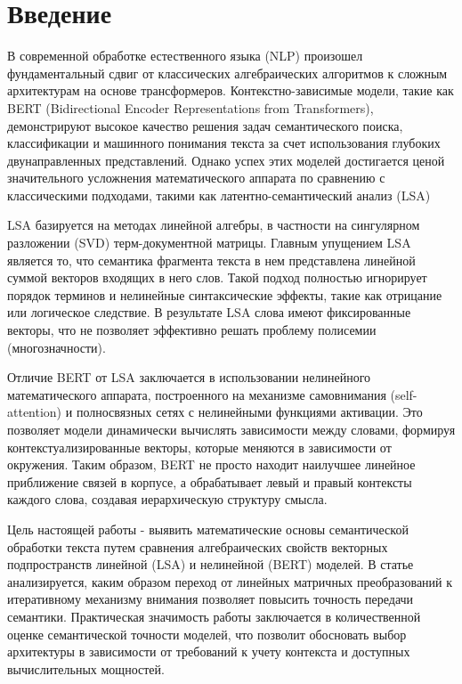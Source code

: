 \documentclass{article}
\begin{document}
\section{Введение}

В современной обработке естественного языка (NLP) произошел фундаментальный
сдвиг от классических алгебраических алгоритмов к сложным архитектурам на основе
трансформеров. Контекстно-зависимые модели, такие как BERT
(Bidirectional Encoder Representations from Transformers), демонстрируют
высокое качество решения задач семантического поиска, классификации и машинного
понимания текста за счет использования глубоких двунаправленных
представлений. Однако успех этих моделей достигается ценой значительного
усложнения математического аппарата по сравнению с классическими подходами,
такими как латентно-семантический анализ (LSA)

LSA базируется на методах линейной алгебры, в частности на сингулярном
разложении (SVD) терм-документной матрицы. Главным упущением LSA является то,
что семантика фрагмента текста в нем представлена линейной суммой векторов
входящих в него слов. Такой подход полностью игнорирует порядок терминов и
нелинейные синтаксические эффекты, такие как отрицание или логическое следствие.
В результате LSA слова имеют фиксированные векторы, что не позволяет эффективно
решать проблему полисемии (многозначности).

Отличие BERT от LSA заключается в использовании нелинейного математического
аппарата, построенного на механизме самовнимания (self-attention) и полносвязных
сетях с нелинейными функциями активации. Это позволяет модели динамически
вычислять зависимости между словами, формируя контекстуализированные векторы,
которые меняются в зависимости от окружения. Таким образом, BERT не просто
находит наилучшее линейное приближение связей в корпусе, а обрабатывает левый и
правый контексты каждого слова, создавая иерархическую структуру смысла.

Цель настоящей работы - выявить математические основы семантической обработки
текста путем сравнения алгебраических свойств векторных подпространств линейной
(LSA) и нелинейной (BERT) моделей. В статье анализируется, каким образом переход
от линейных матричных преобразований к итеративному механизму внимания позволяет
повысить точность передачи семантики. Практическая значимость работы заключается
в количественной оценке семантической точности моделей, что позволит обосновать
выбор архитектуры в зависимости от требований к учету контекста и доступных
вычислительных мощностей.
\end{document}
